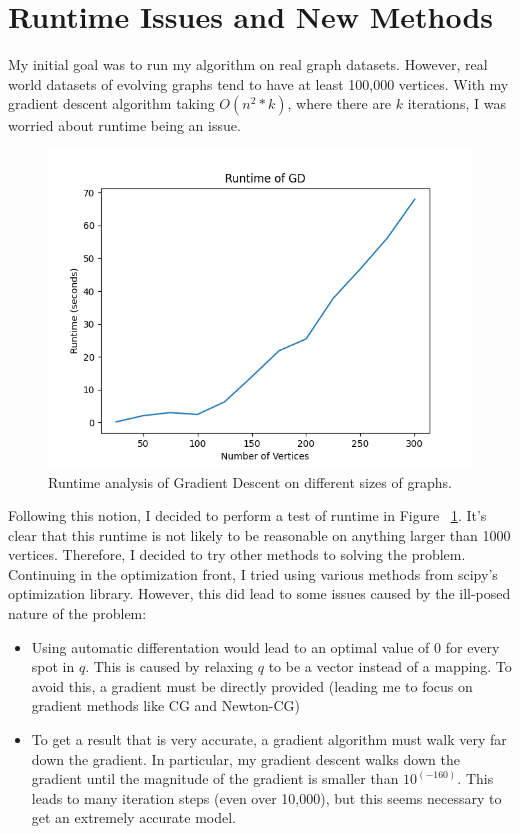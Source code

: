 \section{Runtime Issues and New Methods}

My initial goal was to run my algorithm on real graph datasets.
However, real world datasets of evolving graphs tend to have at least 100,000 vertices.
With my gradient descent algorithm taking $O(n^2 * k)$, where there are $k$ iterations, I was worried about
runtime being an issue.

\begin{figure}
    \begin{center}
        \includegraphics[scale=0.6]{figures/Runtime of Gradient Descent.png}
    \end{center}

    \caption{
        Runtime analysis of Gradient Descent on different sizes of graphs.
    }
    \label{fig:sgd-runtime}
\end{figure}

Following this notion, I decided to perform a test of runtime in Figure ~\ref{fig:sgd-runtime}.
It's clear that this runtime is not likely to be reasonable on anything larger than 1000 vertices.
Therefore, I decided to try other methods to solving the problem.
Continuing in the optimization front, I tried using various methods from scipy's optimization library.
However, this did lead to some issues caused by the ill-posed nature of the problem:

\begin{itemize}
    \item Using automatic differentation would lead to an optimal value of 0 for every spot in $q$.
          This is caused by relaxing $q$ to be a vector instead of a mapping.
          To avoid this, a gradient must be directly provided (leading me to focus on gradient methods like CG and Newton-CG)
    \item To get a result that is very accurate, a gradient algorithm must walk very far down the gradient.
          In particular, my gradient descent walks down the gradient until the magnitude of the gradient is smaller than $10^(-160)$. 
          This leads to many iteration steps (even over 10,000), but this seems necessary to get an extremely accurate model.
\end{itemize}

